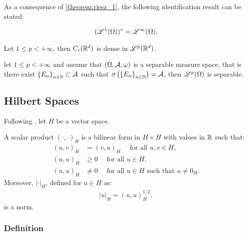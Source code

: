 As a consequence of \cref{theorem:riesz_1}, the following identification result can be stated:

\begin{theorem}
    \begin{gather}
        (\mathscr{L}^{1}(\Omega))^* = \mathscr{L}^{\infty}(\Omega).
    \end{gather}
\end{theorem}

\begin{theorem}
    Let $1 \leq p < +\infty$, then $C_c(\mathbb{R}^{d})$ is dense in $\mathscr{L}^{p}(\mathbb{R}^{d})$.
\end{theorem}

\begin{theorem}
    let $1 \leq p < +\infty$ and assume that $(\Omega, \mathcal{A}, \omega)$ is a separable measure space, that is there exist $\left\{ E_n \right\}_{n \in \mathbb{N}} \subset \mathcal{A}$ such that $\sigma \left( \left\{ E_n \right\}_{n \in \mathbb{N}} \right) = \mathcal{A}$, then $\mathscr{L}^{p}(\Omega)$ is separable.
\end{theorem}

\newpage
\subsection{Hilbert Spaces}

Following \cite[p. 131]{Brezis2010}, let $H$ be a vector space.

\begin{definition}
    A scalar product $\left( \cdot, \cdot \right)_H$ is a bilinear form in $H \times H$ with values in $\mathbb{R}$ such that:
    \begin{align}
        (u, v)_H & = (v, u)_H \quad \text{ for all } u, v \in H, \\
        (u, u)_H & \geq 0 \quad \text{ for all } u \in H, \\
        (u, u)_H & \neq 0 \quad \text{ for all } u \in H \text{ such that } u \neq 0_H.
    \end{align}
    Moreover, $\lvert \cdot \rvert_H$, defined for $u \in H$ as:
    \begin{gather} %
        \lvert u \rvert_H = (u, u)_H^{1/2},
    \end{gather}
    is a norm.
\end{definition}

\subsubsection{Definition}

